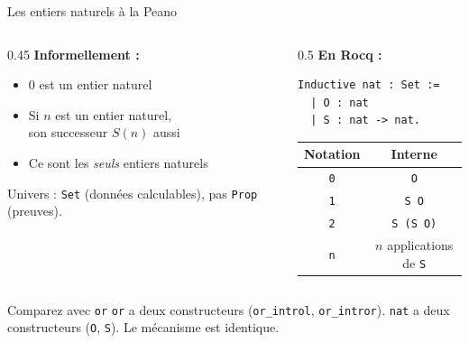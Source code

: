 \documentclass[aspectratio=169]{beamer}
\begin{document}
\begin{frame}[fragile]{Les entiers naturels à la Peano}
  \begin{columns}
    \begin{column}{0.45\textwidth}
      \textbf{Informellement :}
      \begin{itemize}
        \item $0$ est un entier naturel
        \item Si $n$ est un entier naturel, \\ son successeur $S(n)$ aussi
        \item Ce sont les \emph{seuls} entiers naturels
      \end{itemize}
      \medskip
      Univers : \texttt{Set} (données calculables), pas \texttt{Prop} (preuves).
    \end{column}
    \begin{column}{0.5\textwidth}
      \textbf{En Rocq :}
\begin{verbatim}
Inductive nat : Set :=
  | O : nat
  | S : nat -> nat.
\end{verbatim}
      \medskip
      \begin{center}
        \small
        \begin{tabular}{cc}
          \hline
          \textbf{Notation} & \textbf{Interne} \\
          \hline
          \texttt{0} & \texttt{O} \\
          \texttt{1} & \texttt{S O} \\
          \texttt{2} & \texttt{S (S O)} \\
          \texttt{n} & $n$ applications de \texttt{S} \\
          \hline
        \end{tabular}
      \end{center}
    \end{column}
  \end{columns}
  \pause
  \begin{block}{Comparez avec \texttt{or}}
    \texttt{or} a deux constructeurs (\texttt{or\_introl}, \texttt{or\_intror}).
    \texttt{nat} a deux constructeurs (\texttt{O}, \texttt{S}).
    Le mécanisme est identique.
  \end{block}
\end{frame}
\end{document}
